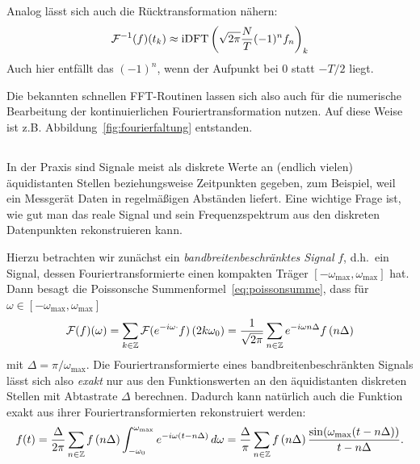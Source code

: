 Analog lässt sich auch die Rücktransformation nähern:
\begin{equation}
  \label{eq:idftcont}
  \mathcal F^{-1}(f)(t_k)\approx
  \text{iDFT}\left(\sqrt{2\pi}\frac{N}{T}(-1)^n f_n\right)_k
\end{equation}
Auch hier entfällt das $(-1)^n$, wenn der Aufpunkt bei 0 statt $-T/2$
liegt.

Die bekannten schnellen FFT-Routinen lassen sich also auch für die
numerische Bearbeitung der kontinuierlichen Fouriertransformation
nutzen. Auf diese Weise ist z.B. Abbildung~\ref{fig:fourierfaltung}
entstanden.

\subsection{}

In der Praxis sind Signale meist als diskrete Werte an (endlich
vielen) äquidistanten Stellen beziehungsweise Zeitpunkten gegeben, zum
Beispiel, weil ein Messgerät Daten in regelmäßigen Abständen liefert.
Eine wichtige Frage ist, wie gut man das reale Signal und sein
Frequenzspektrum aus den diskreten Datenpunkten rekonstruieren kann.

Hierzu betrachten wir zunächst ein \emph{bandbreitenbeschränktes
  Signal} $f$, d.h.\ ein Signal, dessen Fouriertransformierte einen
kompakten Träger $[-\omega_\text{max},\omega_\text{max}]$ hat. Dann besagt die
Poissonsche Summenformel~\eqref{eq:poissonsumme}, dass für
$\omega\in[-\omega_\text{max},\omega_\text{max}]$
\begin{equation}
  \mathcal F(f)(\omega) =
  \sum_{k\in\mathbb{Z}}\mathcal F(e^{-i\omega \cdot} f)\left(2k\omega_0\right)
  =
  \frac{1}{\sqrt{2\pi}}
  \sum_{n\in\mathbb{Z}} e^{-i \omega n \Delta}f\left(n \Delta\right)
\end{equation}
mit $\Delta=\pi/\omega_\text{max}$. Die Fouriertransformierte eines
bandbreitenbeschränkten Signals lässt sich also \emph{exakt} nur aus
den Funktionswerten an den äquidistanten diskreten Stellen mit
Abtastrate $\Delta$ berechnen. Dadurch kann natürlich auch die
Funktion exakt aus ihrer Fouriertransformierten rekonstruiert werden:
\begin{equation}
  \label{eq:ftreconst}
  f(t)
  = \frac{\Delta}{2\pi}\sum_{n\in\mathbb{Z}} f\left(n \Delta\right)
  \int_{-\omega_0}^{\omega_\text{max}} e^{-i \omega (t - n\Delta)} \,d\omega
  = \frac{\Delta}{\pi}\sum_{n\in\mathbb{Z}} f\left(n \Delta\right)
  \frac{\sin(\omega_\text{max}(t-n\Delta))}{t-n\Delta}.
\end{equation}

